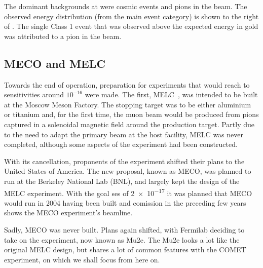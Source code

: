 The dominant backgrounds at \sindrumII were cosmic events and pions in the beam.  
The observed energy distribution (from the main event category) is shown to the right of .  
The single Class 1 event that was observed above the expected \mueconv energy in gold was attributed to a pion in the beam.

\subsection{MECO and MELC}
Towards the end of \sindrumII operation, preparation for experiments that would reach to sensitivities around $10^{-16}$ were made.
The first, MELC~\cite{MELC}, was intended to be built at the Moscow Meson Factory.
The stopping target was to be either aluminium or titanium and, for the first time, the muon beam would be produced from pions captured in a solenoidal magnetic field around the production target.
Partly due to the need to adapt the primary beam at the host facility, MELC was never completed, although some aspects of the experiment had been constructed.

With its cancellation, proponents of the experiment shifted their plans to the United States of America.  
The new proposal, known as MECO, was planned to run at the Berkeley National Lab (BNL), and largely kept the design of the MELC experiment.
With the goal \ac{ses} of \num{2e-17} it was planned that MECO would run in 2004 having been built and comission in the preceding few years~\cite{MECO}
 shows the MECO experiment's beamline.

Sadly, MECO was never built.  
Plans again shifted, with Fermilab deciding to take on the experiment, now known as Mu2e.
The Mu2e looks a lot like the original MELC design, but shares a lot of common features with the COMET experiment, on which we shall focus from here on.
